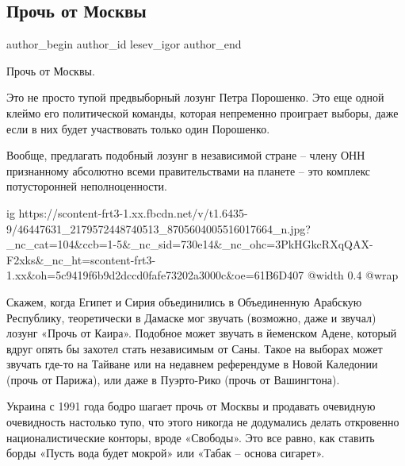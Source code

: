  
 
 
 
 
 
\subsection{Прочь от Москвы}
\label{sec:19_11_2018.fb.lesev_igor.1.prochj_ot_moskvy}
 
\ifcmt
 author_begin
   author_id lesev_igor
 author_end
\fi

Прочь от Москвы.

Это не просто тупой предвыборный лозунг Петра Порошенко. Это еще одной клеймо
его политической команды, которая непременно проиграет выборы, даже если в них
будет участвовать только один Порошенко.

Вообще, предлагать подобный лозунг в независимой стране – члену ОНН признанному
абсолютно всеми правительствами на планете – это комплекс потусторонней
неполноценности.

\ifcmt
  ig https://scontent-frt3-1.xx.fbcdn.net/v/t1.6435-9/46447631_2179572448740513_8705604005516017664_n.jpg?_nc_cat=104&ccb=1-5&_nc_sid=730e14&_nc_ohc=3PkHGkcRXqQAX-F2xks&_nc_ht=scontent-frt3-1.xx&oh=5c9419f6b9d2dccd0fafe73202a3000c&oe=61B6D407
  @width 0.4
  @wrap 
\fi

Скажем, когда Египет и Сирия объединились в Объединенную Арабскую Республику,
теоретически в Дамаске мог звучать (возможно, даже и звучал) лозунг «Прочь от
Каира». Подобное может звучать в йеменском Адене, который вдруг опять бы
захотел стать независимым от Саны. Такое на выборах может звучать где-то на
Тайване или на недавнем референдуме в Новой Каледонии (прочь от Парижа), или
даже в Пуэрто-Рико (прочь от Вашингтона).

Украина с 1991 года бодро шагает прочь от Москвы и продавать очевидную
очевидность настолько тупо, что этого никогда не додумались делать откровенно
националистические конторы, вроде «Свободы». Это все равно, как ставить борды
«Пусть вода будет мокрой» или «Табак – основа сигарет».

